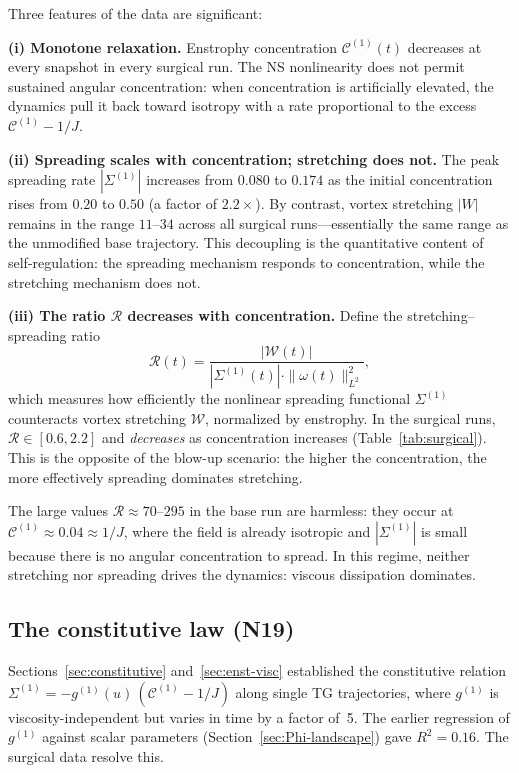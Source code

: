 \documentclass[11pt]{article}
\theoremstyle{definition}
\newcommand{\cC}{\mathcal{C}}
\begin{document}
Three features of the data are significant:

\medskip\noindent\textbf{(i) Monotone relaxation.}
Enstrophy concentration $\cC^{(1)}(t)$ decreases at
every snapshot in every surgical run.  The NS
nonlinearity does not permit sustained angular
concentration: when concentration is artificially
elevated, the dynamics pull it back toward isotropy
with a rate proportional to the excess
$\cC^{(1)}-1/J$.

\medskip\noindent\textbf{(ii) Spreading scales with
concentration; stretching does not.}
The peak spreading rate $|\Sigma^{(1)}|$ increases
from $0.080$ to $0.174$ as the initial concentration
rises from $0.20$ to $0.50$ (a factor of $2.2\times$).
By contrast, vortex stretching $|W|$ remains in the
range $11$--$34$ across all surgical runs---essentially
the same range as the unmodified base trajectory.
This decoupling is the quantitative content of
self-regulation: the spreading mechanism responds
to concentration, while the stretching mechanism
does not.

\medskip\noindent\textbf{(iii) The ratio
$\mathcal{R}$ decreases with concentration.}
Define the stretching--spreading ratio
\begin{equation}\label{eq:R-ratio}
\mathcal{R}(t) = \frac{|\mathcal{W}(t)|}
{|\Sigma^{(1)}(t)|\cdot\|\omega(t)\|_{L^2}^2},
\end{equation}
which measures how efficiently the nonlinear
spreading functional $\Sigma^{(1)}$ counteracts
vortex stretching $\mathcal{W}$, normalized by
enstrophy.  In the surgical runs,
$\mathcal{R}\in[0.6, 2.2]$ and \emph{decreases}
as concentration increases
(Table~\ref{tab:surgical}).  This is the opposite
of the blow-up scenario: the higher the
concentration, the more effectively spreading
dominates stretching.

The large values $\mathcal{R}\approx 70$--$295$
in the base run are harmless: they occur at
$\cC^{(1)}\approx 0.04 \approx 1/J$, where the
field is already isotropic and $|\Sigma^{(1)}|$ is
small because there is no angular concentration to
spread.  In this regime, neither stretching nor
spreading drives the dynamics: viscous dissipation
dominates.


\subsection{The constitutive law (N19)}
\label{sec:constitutive-surgical}

Sections~\ref{sec:constitutive}
and~\ref{sec:enst-visc} established the constitutive
relation $\Sigma^{(1)} = -g^{(1)}(u)\,
(\cC^{(1)}-1/J)$ along single TG trajectories, where
$g^{(1)}$ is viscosity-independent but varies in
time by a factor of~5.  The earlier regression of
$g^{(1)}$ against scalar parameters
(Section~\ref{sec:Phi-landscape}) gave $R^2=0.16$.
The surgical data resolve this.
\end{document}
